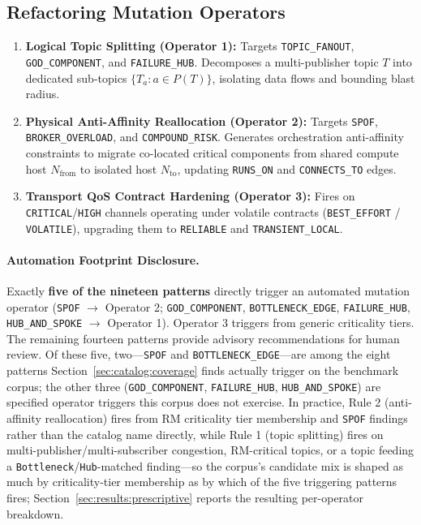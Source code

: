 \subsection{Refactoring Mutation Operators}
\label{sec:prescribe:operators}

\begin{enumerate}
    \item \textbf{Logical Topic Splitting (Operator 1):} Targets \texttt{TOPIC\_FANOUT}, \texttt{GOD\_COMPONENT}, and \texttt{FAILURE\_HUB}. Decomposes a multi-publisher topic $T$ into dedicated sub-topics $\{T_a : a \in P(T)\}$, isolating data flows and bounding blast radius.
    \item \textbf{Physical Anti-Affinity Reallocation (Operator 2):} Targets \texttt{SPOF}, \texttt{BROKER\_OVERLOAD}, and \texttt{COMPOUND\_RISK}. Generates orchestration anti-affinity constraints to migrate co-located critical components from shared compute host $N_{\text{from}}$ to isolated host $N_{\text{to}}$, updating \texttt{RUNS\_ON} and \texttt{CONNECTS\_TO} edges.
    \item \textbf{Transport QoS Contract Hardening (Operator 3):} Fires on \texttt{CRITICAL}/\texttt{HIGH} channels operating under volatile contracts (\texttt{BEST\_EFFORT} / \texttt{VOLATILE}), upgrading them to \texttt{RELIABLE} and \texttt{TRANSIENT\_LOCAL}.
\end{enumerate}

\paragraph{Automation Footprint Disclosure.}
Exactly \textbf{five of the nineteen patterns} directly trigger an automated mutation operator (\texttt{SPOF} $\to$ Operator 2; \texttt{GOD\_COMPONENT}, \texttt{BOTTLENECK\_EDGE}, \texttt{FAILURE\_HUB}, \texttt{HUB\_AND\_SPOKE} $\to$ Operator 1). Operator 3 triggers from generic criticality tiers. The remaining fourteen patterns provide advisory recommendations for human review. Of these five, two---\texttt{SPOF} and \texttt{BOTTLENECK\_EDGE}---are among the eight patterns Section~\ref{sec:catalog:coverage} finds actually trigger on the benchmark corpus; the other three (\texttt{GOD\_COMPONENT}, \texttt{FAILURE\_HUB}, \texttt{HUB\_AND\_SPOKE}) are specified operator triggers this corpus does not exercise. In practice, Rule 2 (anti-affinity reallocation) fires from RM criticality tier membership and \texttt{SPOF} findings rather than the catalog name directly, while Rule 1 (topic splitting) fires on multi-publisher/multi-subscriber congestion, RM-critical topics, or a topic feeding a \texttt{Bottleneck}/\texttt{Hub}-matched finding---so the corpus's candidate mix is shaped as much by criticality-tier membership as by which of the five triggering patterns fires; Section~\ref{sec:results:prescriptive} reports the resulting per-operator breakdown.

